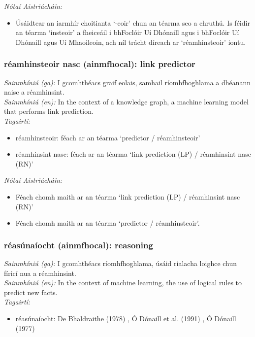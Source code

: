  \noindent \textit{Nótaí Aistriúcháin:}
\begin{itemize}
	\item Úsáidtear an iarmhír choitianta `-eoir' chun an téarma seo a chruthú. Is féidir an téarma `insteoir' a fheiceáil i bhFoclóir Uí Dhónaill agus i bhFoclóir Uí Dhónaill agus Uí Mhaoileoin, ach níl trácht díreach ar `réamhinsteoir' iontu.
\end{itemize}


\subsubsection*{réamhinsteoir nasc (ainmfhocal): link predictor}
 \noindent \textit{Sainmhíniú (ga):} I gcomhthéacs graif eolais, samhail ríomhfhoghlama a dhéanann naisc a réamhinsint.
\\
 \noindent \textit{Sainmhíniú (en):} In the context of a knowledge graph, a machine learning model that performs link prediction.
\\
 \noindent \textit{Tagairtí:}
\begin{itemize}
	\item réamhinsteoir: féach ar an téarma `predictor / réamhinsteoir'
	\item réamhinsint nasc: féach ar an téarma `link prediction (LP) / réamhinsint nasc (RN)'
\end{itemize}

 \noindent \textit{Nótaí Aistriúcháin:}
\begin{itemize}
	\item Féach chomh maith ar an téarma `link prediction (LP) / réamhinsint nasc (RN)'
	\item Féach chomh maith ar an téarma `predictor / réamhinsteoir'.
\end{itemize}


\subsubsection*{réasúnaíocht (ainmfhocal): reasoning}
 \noindent \textit{Sainmhíniú (ga):} I gcomhthéacs ríomhfhoghlama, úsáid rialacha loighce chun fíricí nua a réamhinsint.
\\
 \noindent \textit{Sainmhíniú (en):} In the context of machine learning, the use of logical rules to predict new facts.
\\
 \noindent \textit{Tagairtí:}
\begin{itemize}
	\item réasúnaíocht: De Bhaldraithe (1978) \cite{de-bhaldraithe}, Ó Dónaill et al. (1991) \cite{focloir-beag}, Ó Dónaill (1977) \cite{odonaill}
\end{itemize}

